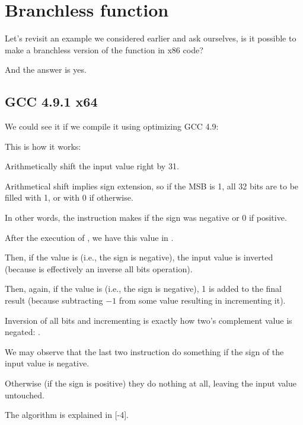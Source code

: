 \chapter{Branchless  function}
\label{chap:branchless_abs}

Let's revisit an example we considered earlier  and ask ourselves, is it possible
to make a branchless version of the function in x86 code?



And the answer is yes.

\section{\Optimizing GCC 4.9.1 x64}

We could see it if we compile it using optimizing GCC 4.9:



This is how it works:

Arithmetically shift the input value right by 31.

Arithmetical shift implies sign extension, so if the \ac{MSB} is 1, 
all 32 bits are to be filled with 1, or with 0 if otherwise.

In other words, the  instruction makes  if the sign was negative or 0 if positive.

After the execution of , we have this value in \EDX.

Then, if the value is  (i.e., the sign is negative), the input value is inverted 
(because  is effectively an inverse all bits operation).

Then, again, if the value is  (i.e., the sign is negative), 1 is added to the final result (because
subtracting $-1$ from some value resulting in incrementing it).

Inversion of all bits and incrementing is exactly how two's complement value is negated: 
.

We may observe that the last two instruction do something if the sign of the input value is negative.

Otherwise (if the sign is positive) they do nothing at all, leaving the input value untouched.

The algorithm is explained in [-4].

